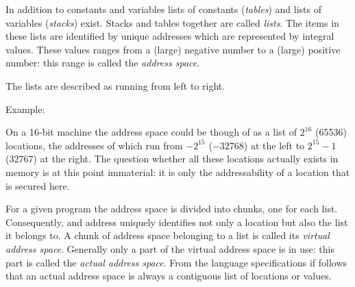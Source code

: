\documentclass{article}
\begin{document}
In addition to constants and variables lists of constants
(\emph{tables}) and lists of variables (\emph{stacks}) exist. Stacks and tables
together are called \emph{lists}. The items in these lists are identified
by unique addresses which are represented by integral values. These values
ranges from a (large) negative number to a (large) positive number:
this range is called the \emph{address space}.

The lists are described as running from left to right.

\smallskip\noindent
Example:

\noindent
On a 16-bit machine the address space could be though of as a list of
$2^{16}$ (65536) locations, the addresses of which run from $-2^{15}$ 
($-32768$) at the left to $2^{15}-1$ (32767) at the right. The question
whether all these locations actually exists in memory is at this point
immaterial: it is only the addressability of a location that is secured
here.

\smallskip

For a given program the address space is divided into chunks, one for each
list. Consequently, and address uniquely identifies not only a location but
also the list it belongs to. A chunk of address space belonging to a list is
called its \emph{virtual address space}. Generally only a part of the
virtual address space is in use: this part is called the \emph{actual
address space}. From the language specifications if follows that an actual
address space is always a contiguous list of locations or values.
\end{document}
